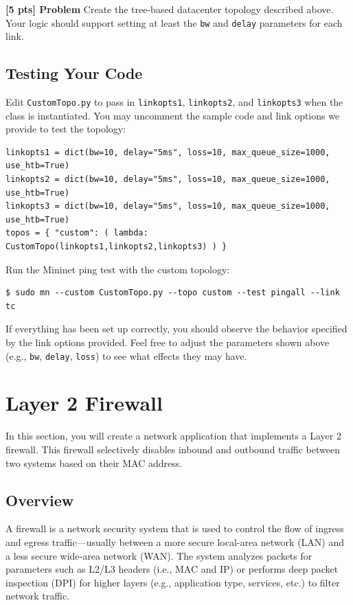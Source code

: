 \documentclass{article}
\newcounter{QuestionCounter}
\newcommand{\questionbox}[2]{
\stepcounter{QuestionCounter}
\begin{framed}
\noindent
\textbf{[#1 pts] Problem \arabic{QuestionCounter}}
\vspace{5pt}
\newline
\noindent#2
\end{framed}
}
\begin{document}
\questionbox{5}{
Create the tree-based datacenter topology described above.
Your logic should support setting at least the \texttt{bw} and \texttt{delay} parameters for each link.
}

\subsection{Testing Your Code}
Edit \texttt{CustomTopo.py} to pass in \texttt{linkopts1}, \texttt{linkopts2}, and \texttt{linkopts3} when the class is instantiated.
You may uncomment the sample code and link options we provide to test the topology:

\begin{topbot}
\begin{verbatim}
linkopts1 = dict(bw=10, delay="5ms", loss=10, max_queue_size=1000, use_htb=True)
linkopts2 = dict(bw=10, delay="5ms", loss=10, max_queue_size=1000, use_htb=True)
linkopts3 = dict(bw=10, delay="5ms", loss=10, max_queue_size=1000, use_htb=True)
topos = { "custom": ( lambda: CustomTopo(linkopts1,linkopts2,linkopts3) ) }
\end{verbatim}
\end{topbot}

\noindent
Run the Mininet ping test with the custom topology:

\begin{topbot}
\begin{verbatim}
$ sudo mn --custom CustomTopo.py --topo custom --test pingall --link tc
\end{verbatim}
\end{topbot}

\noindent
If everything has been set up correctly, you should observe the behavior specified by the link options provided.
Feel free to adjust the parameters shown above (e.g., \texttt{bw}, \texttt{delay}, \texttt{loss}) to see what effects they may have.

\section{Layer 2 Firewall}

In this section, you will create a network application that implements a Layer 2 firewall.
This firewall selectively disables inbound and outbound traffic between two systems based on their MAC address.

\subsection{Overview}
A firewall is a network security system that is used to control the flow of ingress and egress traffic---usually between a more secure local-area network (LAN) and a less secure wide-area network (WAN).
The system analyzes packets for parameters such as L2/L3 headers (i.e., MAC and IP) or performs deep packet inspection (DPI) for higher layers (e.g., application type, services, etc.) to filter network traffic.
\end{document}
